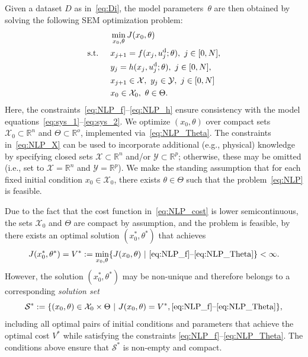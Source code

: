 \documentclass[a4paper,fleqn]{cas-dc}
\begin{document}
Given a dataset $D$ as in~\eqref{eq:Di}, the model parameters~$\theta$ are then obtained by solving the following SEM optimization problem:%
\begin{subequations}
	\label{eq:NLP}
	\begin{align}
		&\min\limits_{x_0,\theta} J(x_0,\theta) \label{eq:NLP_min}\\
		\text{s.t. \quad }
		& x_{j+1} = f(x_j,u_j^\mathrm{d};\theta), \ j\in[0,N], \label{eq:NLP_f}\\
		& y_{j} = h(x_{j},u_j^\mathrm{d};\theta), \ j\in[0,N],\label{eq:NLP_h}\\
		& x_{j+1}\in\mathcal{X}, \ y_{j} \in \mathcal{Y},\ j\in[0,N] \label{eq:NLP_X}\\
		& x_0\in\mathcal{X}_0, \ \theta \in \Theta. \label{eq:NLP_Theta}
	\end{align}
\end{subequations}
Here, the constraints~\eqref{eq:NLP_f}--\eqref{eq:NLP_h} ensure consistency with the model equations~\eqref{eq:sys_1}--\eqref{eq:sys_2}.
We optimize $(x_0,\theta)$ over compact sets $\mathcal{X}_0\subset\mathbb{R}^n$ and $\Theta\subset\mathbb{R}^o$, implemented via~\eqref{eq:NLP_Theta}.
The constraints in~\eqref{eq:NLP_X} can be used to incorporate additional (e.g., physical) knowledge by specifying closed sets $\mathcal{X}\subset\mathbb{R}^n$ and/or $\mathcal{Y}\subset\mathbb{R}^p$; otherwise, these may be omitted (i.e., set to $\mathcal{X}=\mathbb{R}^n$ and $\mathcal{Y}=\mathbb{R}^p$).
We make the standing assumption that for each fixed initial condition $x_0\in \mathcal{X}_0$, there exists $\theta\in\Theta$ such that the problem~\eqref{eq:NLP} is feasible.

Due to the fact that the cost function in~\eqref{eq:NLP_cost} is lower semicontinuous, the sets $\mathcal{X}_0$ and $\Theta$ are compact by assumption, and the problem is feasible, by \cite[Th.~1.9]{Rockafellar1998} there exists an optimal solution $(x_0^*,\theta^*)$ that achieves
\begin{equation}\label{eq:NLP_case_TP}
	J(x_0^*,\theta^*) = V^* := \min_{x_0,\theta}\{ J(x_0,\theta)\ |\  \text{\eqref{eq:NLP_f}--\eqref{eq:NLP_Theta}}\}<\infty.
\end{equation}
However, the solution $(x_0^*,\theta^*)$ may be non-unique and therefore belongs to a corresponding \emph{solution set}
\begin{equation}\label{eq:S_star}
	\mathcal{S}^*:=\{(x_0,\theta)\in\mathcal{X}_0\times\Theta \ | \ J(x_0,\theta) = V^*, \text{\eqref{eq:NLP_f}--\eqref{eq:NLP_Theta}}\},
\end{equation}
including all optimal pairs of initial conditions and parameters that achieve the optimal cost $V^*$ while satisfying the constraints \eqref{eq:NLP_f}--\eqref{eq:NLP_Theta}. The conditions above ensure that $\mathcal{S}^*$ is non-empty and compact.
\end{document}
